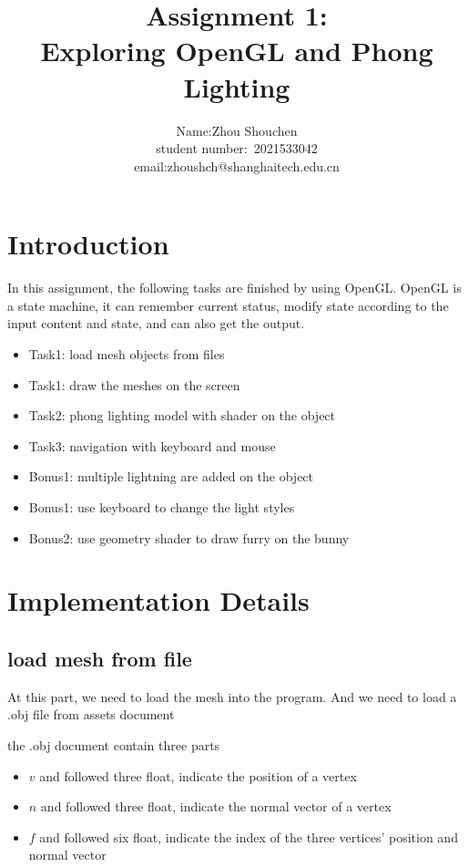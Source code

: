 \documentclass[acmtog]{acmart}
\title{Assignment 1:\\ {Exploring OpenGL and Phong Lighting}}
\author{Name:\quad  Zhou Shouchen  \\ student number:\ 2021533042
\\email:\quad zhoushch@shanghaitech.edu.cn}
\begin{document}
\maketitle

\vspace*{2 ex}

\section{Introduction}
In this assignment, the following tasks are finished by using OpenGL.
OpenGL is a state machine, it can remember current status,
modify state according to the input content and state, and can also get the output.

\begin{itemize}
\item Task1: load mesh objects from files
\item Task1: draw the meshes on the screen
\item Task2: phong lighting model with shader on the object
\item Task3: navigation with keyboard and mouse
\item Bonus1: multiple lightning are added on the object
\item Bonus1: use keyboard to change the light styles
\item Bonus2: use geometry shader to draw furry on the bunny
\end{itemize}

\section{Implementation Details}
\subsection{load mesh from file}
At this part, we need to load the mesh into the program.
And we need to load a .obj file from assets document

the .obj document contain three parts
\begin{itemize}
\item \(v\) and followed three float, indicate the position of a vertex
\item \(n\) and followed three float, indicate the normal vector of a vertex
\item \(f\) and followed six float, indicate the index of the three vertices' position and normal vector
\end{itemize}
\end{document}
